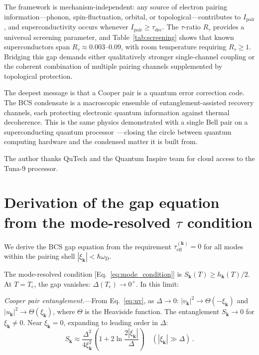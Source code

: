 \documentclass[prb,twocolumn,superscriptaddress,longbibliography,floatfix]{revtex4-2}
\newcommand{\tauasym}{\tau}
\newcommand{\taueff}{\tauasym_{\mathrm{eff}}}
\newcommand{\taudec}{\tauasym_{\mathrm{dec}}}
\newcommand{\Ipair}{I_{\mathrm{pair}}}
\newcommand{\Rtau}{R_{\tauasym}}
\newcommand{\Tc}{T_{\mathrm{c}}}
\newcommand{\oD}{\omega_{\mathrm{D}}}
\newcommand{\xik}{\xi_{\bm{k}}}
\begin{document}
The framework is mechanism-independent: any source of electron
pairing information---phonon, spin-fluctuation, orbital, or
topological---contributes to $\Ipair$, and superconductivity
occurs whenever $\Ipair \geq \taudec$.  The $\tauasym$-ratio
$\Rtau$ provides a universal screening parameter, and Table~\ref{tab:screening}
shows that known superconductors span $\Rtau \approx 0.003$--$0.09$,
with room temperature requiring $\Rtau \geq 1$.  Bridging this
gap demands either qualitatively stronger single-channel coupling
or the coherent combination of multiple pairing channels supplemented
by topological protection.

The deepest message is that a Cooper pair is a quantum error
correction code.  The BCS condensate is a macroscopic ensemble of
entanglement-assisted recovery channels, each protecting electronic
quantum information against thermal decoherence.  This is the same
physics demonstrated with a single Bell pair on a superconducting
quantum processor~\cite{Huang2026exp}---closing the circle between
quantum computing hardware and the condensed matter it is built from.

\begin{acknowledgments}
The author thanks QuTech and the Quantum Inspire team for cloud
access to the Tuna-9 processor.
\end{acknowledgments}

\appendix

\section{Derivation of the gap equation from the mode-resolved
$\tauasym$ condition}
\label{app:gap_derivation}

We derive the BCS gap equation from the requirement
$\taueff^{(\bm{k})} = 0$ for all modes within the pairing shell
$|\xik| < \hbar\oD$.

The mode-resolved condition [Eq.~\eqref{eq:mode_condition}] is
$S_{\bm{k}}(T) \geq h_{\bm{k}}(T)/2$.  At $T = \Tc$, the gap
vanishes: $\Delta(\Tc) \to 0^+$.  In this limit:

\textit{Cooper pair entanglement.}---From Eq.~\eqref{eq:uv},
as $\Delta \to 0$:
$|v_{\bm{k}}|^2 \to \Theta(-\xik)$
and $|u_{\bm{k}}|^2 \to \Theta(\xik)$, where $\Theta$ is the
Heaviside function.  The entanglement $S_{\bm{k}} \to 0$ for
$\xik \neq 0$.  Near $\xik = 0$, expanding to leading order in
$\Delta$:
\begin{equation}\label{eq:S_expand}
  S_{\bm{k}} \approx \frac{\Delta^2}{4\xik^2}
  \left(1 + 2\ln\frac{2|\xik|}{\Delta}\right)
  \quad (|\xik| \gg \Delta)\,.
\end{equation}
\end{document}
